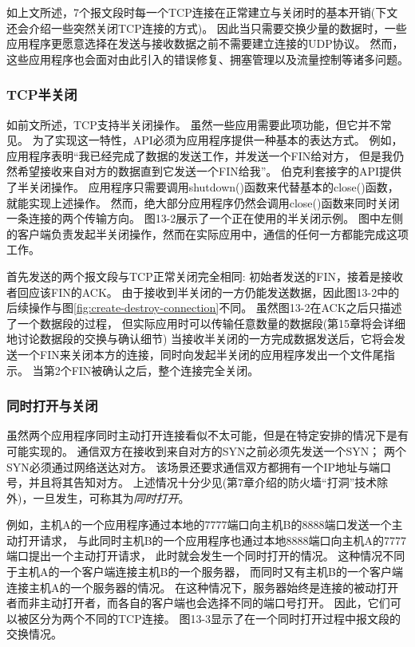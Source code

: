 \documentclass{../main.tex}{subfiles}
\begin{document}
如上文所述，7个报文段时每一个TCP连接在正常建立与关闭时的基本开销(下文还会介绍一些突然关闭TCP连接的方式)。
因此当只需要交换少量的数据时，一些应用程序更愿意选择在发送与接收数据之前不需要建立连接的UDP协议。
然而，这些应用程序也会面对由此引入的错误修复、拥塞管理以及流量控制等诸多问题。

\subsubsection{TCP半关闭}
如前文所述，TCP支持半关闭操作。
虽然一些应用需要此项功能，但它并不常见。
为了实现这一特性，API必须为应用程序提供一种基本的表达方式。
例如，应用程序表明``我已经完成了数据的发送工作，并发送一个FIN给对方，
但是我仍然希望接收来自对方的数据直到它发送一个FIN给我''。
伯克利套接字的API提供了半关闭操作。
应用程序只需要调用shutdown()函数来代替基本的close()函数，就能实现上述操作。
然而，绝大部分应用程序仍然会调用close()函数来同时关闭一条连接的两个传输方向。
图13-2展示了一个正在使用的半关闭示例。
图中左侧的客户端负责发起半关闭操作，然而在实际应用中，通信的任何一方都能完成这项工作。

首先发送的两个报文段与TCP正常关闭完全相同:
初始者发送的FIN，接着是接收者回应该FIN的ACK。
由于接收到半关闭的一方仍能发送数据，因此图13-2中的后续操作与图\ref{fig:create-destroy-connection}不同。
虽然图13-2在ACK之后只描述了一个数据段的过程，
但实际应用时可以传输任意数量的数据段(第15章将会详细地讨论数据段的交换与确认细节)
当接收半关闭的一方完成数据发送后，它将会发送一个FIN来关闭本方的连接，同时向发起半关闭的应用程序发出一个文件尾指示。
当第2个FIN被确认之后，整个连接完全关闭。

\subsubsection{同时打开与关闭}
虽然两个应用程序同时主动打开连接看似不太可能，但是在特定安排的情况下是有可能实现的。
通信双方在接收到来自对方的SYN之前必须先发送一个SYN；
两个SYN必须通过网络送达对方。
该场景还要求通信双方都拥有一个IP地址与端口号，并且将其告知对方。
上述情况十分少见(第7章介绍的防火墙``打洞''技术除外)，一旦发生，可称其为\emph{同时打开}。

例如，主机A的一个应用程序通过本地的7777端口向主机B的8888端口发送一个主动打开请求，
与此同时主机B的一个应用程序也通过本地8888端口向主机A的7777端口提出一个主动打开请求，
此时就会发生一个同时打开的情况。
这种情况不同于主机A的一个客户端连接主机B的一个服务器，
而同时又有主机B的一个客户端连接主机A的一个服务器的情况。
在这种情况下，服务器始终是连接的被动打开者而非主动打开者，而各自的客户端也会选择不同的端口号打开。
因此，它们可以被区分为两个不同的TCP连接。
图13-3显示了在一个同时打开过程中报文段的交换情况。
\end{document}
